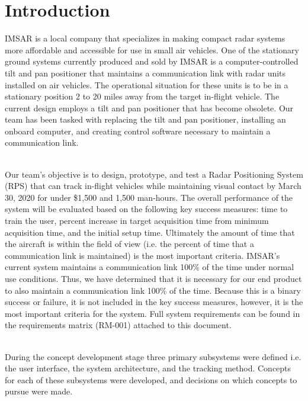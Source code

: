 \chapter{Introduction}

IMSAR is a local company that specializes in making compact radar systems more affordable and accessible for use in small air vehicles. One of the stationary ground systems currently produced and sold by IMSAR is a computer-controlled tilt and pan positioner that maintains a communication link with radar units installed on air vehicles. The operational situation for these units is to be in a stationary position 2 to 20 miles away from the target in-flight vehicle. The current design employs a tilt and pan positioner that has become obsolete. Our team has been tasked with replacing the tilt and pan positioner, installing an onboard computer, and creating control software necessary to maintain a communication link.  

~\\

Our team’s objective is to design, prototype, and test a Radar Positioning System (RPS) that can track in-flight vehicles while maintaining visual contact by March 30, 2020 for under \$1,500 and 1,500 man-hours. The overall performance of the system will be evaluated based on the following key success measures: time to train the user, percent increase in target acquisition time from minimum acquisition time, and the initial setup time. Ultimately the amount of time that the aircraft is within the field of view (i.e. the percent of time that a communication link is maintained) is the most important criteria. IMSAR’s current system maintains a communication link 100\% of the time under normal use conditions. Thus, we have determined that it is necessary for our end product to also maintain a communication link 100\% of the time. Because this is a binary success or failure, it is not included in the key success measures, however, it is the most important criteria for the system. Full system requirements can be found in the requirements matrix (RM-001) attached to this document. 

 ~\\

During the concept development stage three primary subsystems were defined i.e. the user interface, the system architecture, and the tracking method. Concepts for each of these subsystems were developed, and decisions on which concepts to pursue were made.